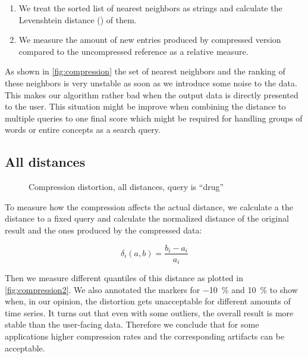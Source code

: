 \begin{enumerate}
    \item We treat the sorted list of nearest neighbors as strings and calculate the Levenshtein distance (\cite{levenshtein}) of them.
    \item We measure the amount of new entries produced by compressed version compared to the uncompressed reference as a relative measure.
\end{enumerate}

As shown in \autoref{fig:compression} the set of nearest neighbors and the ranking of these neighbors is very unstable as soon as we introduce some noise to the data. This makes our algorithm rather bad when the output data is directly presented to the user. This situation might be improve when combining the distance to multiple queries to one final score which might be required for handling groups of words or entire concepts as a search query.


\subsection{All distances}
\label{ssec:evaluation:distortion:dist}

\begin{figure}
    \centering
    
    \caption{Compression distortion, all distances, query is \enquote{drug}}\label{fig:compression2}
\end{figure}

To measure how the compression affects the actual distance, we calculate a the distance to a fixed query and calculate the normalized distance of the original result and the ones produced by the compressed data:

\begin{equation}
    \delta_i(a, b) = \frac{b_i - a_i}{a_i}
\end{equation}

Then we measure different quantiles of this distance as plotted in \autoref{fig:compression2}. We also annotated the markers for \SI{-10}{\percent} and \SI{10}{\percent} to show when, in our opinion, the distortion gets unacceptable for different amounts of time series. It turns out that even with some outliers, the overall result is more stable than the user-facing data. Therefore we conclude that for some applications higher compression rates and the corresponding artifacts can be acceptable.



